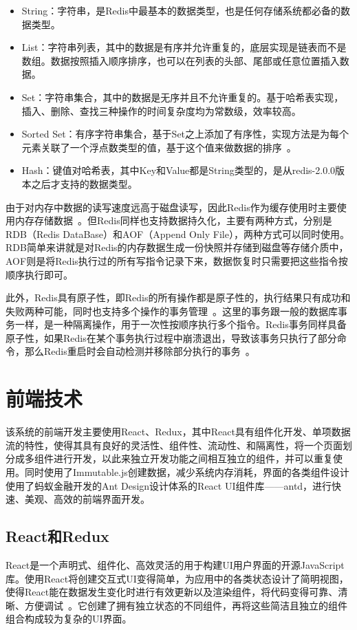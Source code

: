 \begin{itemize}
    \item String：字符串，是Redis中最基本的数据类型，也是任何存储系统都必备的数据类型。
    \item List：字符串列表，其中的数据是有序并允许重复的，底层实现是链表而不是数组。数据按照插入顺序排序，也可以在列表的头部、尾部或任意位置插入数据。
    \item Set：字符串集合，其中的数据是无序并且不允许重复的。基于哈希表实现，插入、删除、查找三种操作的时间复杂度均为常数级，效率较高。
    \item 	Sorted Set：有序字符串集合，基于Set之上添加了有序性，实现方法是为每个元素关联了一个浮点数类型的值，基于这个值来做数据的排序~\cite{lerner2010forge}。
    \item Hash：键值对哈希表，其中Key和Value都是String类型的，是从redis-2.0.0版本之后才支持的数据类型。
\end{itemize}

由于对内存中数据的读写速度远高于磁盘读写，因此Redis作为缓存使用时主要使用内存存储数据~\cite{macedo2011redis}。但Redis同样也支持数据持久化，主要有两种方式，分别是RDB（Redis DataBase）和AOF（Append Only File），两种方式可以同时使用。RDB简单来讲就是对Redis的内存数据生成一份快照并存储到磁盘等存储介质中，AOF则是将Redis执行过的所有写指令记录下来，数据恢复时只需要把这些指令按顺序执行即可。

此外，Redis具有原子性，即Redis的所有操作都是原子性的，执行结果只有成功和失败两种可能，同时也支持多个操作的事务管理~\cite{da2015redis}。这里的事务跟一般的数据库事务一样，是一种隔离操作，用于一次性按顺序执行多个指令。Redis事务同样具备原子性，如果Redis在某个事务执行过程中崩溃退出，导致该事务只执行了部分命令，那么Redis重启时会自动检测并移除部分执行的事务~\cite{nelson2016mastering}。

\section{前端技术}
该系统的前端开发主要使用React、Redux，其中React具有组件化开发、单项数据流的特性，使得其具有良好的灵活性、组件性、流动性、和隔离性，将一个页面划分成多组件进行开发，以此来独立开发功能之间相互独立的组件，并可以重复使用。同时使用了Immutable.js创建数据，减少系统内存消耗，界面的各类组件设计使用了蚂蚁金融开发的Ant Design设计体系的React UI组件库——antd，进行快速、美观、高效的前端界面开发。\\

\subsection{React和Redux}
React是一个声明式、组件化、高效灵活的用于构建UI用户界面的开源JavaScript库。使用React将创建交互式UI变得简单，为应用中的各类状态设计了简明视图，使得React能在数据发生变化时进行有效更新以及渲染组件，将代码变得可靠、清晰、方便调试~\cite{banks2017learning}。它创建了拥有独立状态的不同组件，再将这些简洁且独立的组件组合构成较为复杂的UI界面。

